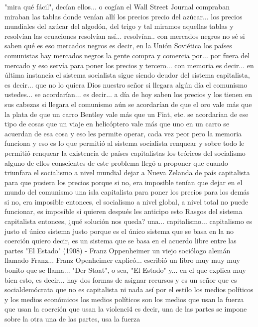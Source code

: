 "mira qué fácil", decían ellos... o cogían el Wall Street Journal compraban miraban las tablas donde venían allí los precios
precio del azúcar... los precios mundiales del azúcar del algodón, del trigo y tal miramos aquellas tablas y resolvían las ecuaciones
resolvían así... resolvían.. con mercados negros no sé si saben qué es eso
mercados negros es decir, en la Unión Soviética los países comunistas hay mercados negros la gente compra y comercia por...
por fuera del mercado y eso servía para poner los precios y tercero...
con memoria es decir... en última instancia el sistema socialista sigue siendo deudor del sistema capitalista, es decir...
que no lo quiera Dios nuestro señor si llegara algún día el comunismo ustedes...
se acordarían... es decir... a día de hoy saben los precios y los tienen en sus cabezas
si llegara el comunismo aún se acordarían de que el oro vale más que la plata de que un carro Bentley vale más que un Fiat, etc.
se acordarían de ese tipo de cosas que un viaje en helicóptero vale más que uno en un carro se acuerdan de esa cosa y eso les permite operar, cada vez peor
pero la memoria funciona y eso es lo que permitió al sistema socialista renquear
y sobre todo le permitió renquear la existencia de países capitalistas los teóricos del socialismo alguno de ellos
conscientes de este problema llegó a proponer que cuando triunfara el socialismo a nivel mundial
dejar a Nueva Zelanda de país capitalista para que pusiera los precios porque si no, era imposible
tenían que dejar en el mundo del comunismo una isla capitalista para poner los precios para los demás si no, era imposible
entonces, el socialismo a nivel global, a nivel total no puede funcionar, es imposible si quieren después les anticipo esto
Rasgos del sistema capitalista
entonces, ¿qué solución nos queda? una... capitalismo...
capitalismo es justo el único sistema justo porque es el único sistema
que se basa en la no coerción quiero decir, es un sistema que se basa en el acuerdo libre entre las partes
"El Estado" (1908) - Franz Oppenheimer
un viejo sociólogo alemán llamado Franz... Franz Openheimer explicó...
escribió un libro muy muy muy bonito que se llama... "Der Staat", o sea, "El Estado" y... en el que explica muy bien esto, es decir...
hay dos formas de asignar recursos y es un señor que es socialdemócrata que no es capitalista ni nada así por el estilo los medios políticos y los medios económicos
los medios políticos son los medios que usan la fuerza que usan la coerción
que usan la violenci4 es decir, una de las partes se impone sobre la otra una de las partes, usa la fuerza
